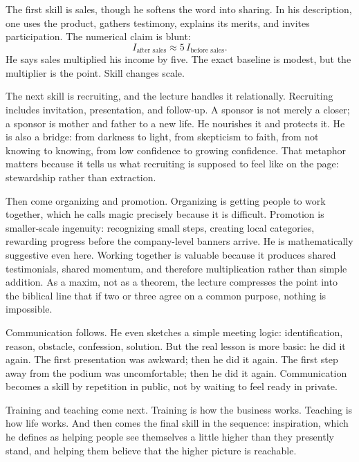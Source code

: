 The first skill is sales, though he softens the word into sharing. In his description, one uses the product, gathers testimony, explains its merits, and invites participation. The numerical claim is blunt:
\begin{equation}
I_{\text{after sales}} \approx 5\,I_{\text{before sales}}.
\end{equation}
He says sales multiplied his income by five. The exact baseline is modest, but the multiplier is the point. Skill changes scale.

The next skill is recruiting, and the lecture handles it relationally. Recruiting includes invitation, presentation, and follow-up. A sponsor is not merely a closer; a sponsor is mother and father to a new life. He nourishes it and protects it. He is also a bridge: from darkness to light, from skepticism to faith, from not knowing to knowing, from low confidence to growing confidence. That metaphor matters because it tells us what recruiting is supposed to feel like on the page: stewardship rather than extraction.

Then come organizing and promotion. Organizing is getting people to work together, which he calls magic precisely because it is difficult. Promotion is smaller-scale ingenuity: recognizing small steps, creating local categories, rewarding progress before the company-level banners arrive. He is mathematically suggestive even here. Working together is valuable because it produces shared testimonials, shared momentum, and therefore multiplication rather than simple addition. As a maxim, not as a theorem, the lecture compresses the point into the biblical line that if two or three agree on a common purpose, nothing is impossible.

Communication follows. He even sketches a simple meeting logic: identification, reason, obstacle, confession, solution. But the real lesson is more basic: he did it again. The first presentation was awkward; then he did it again. The first step away from the podium was uncomfortable; then he did it again. Communication becomes a skill by repetition in public, not by waiting to feel ready in private.

Training and teaching come next. Training is how the business works. Teaching is how life works. And then comes the final skill in the sequence: inspiration, which he defines as helping people see themselves a little higher than they presently stand, and helping them believe that the higher picture is reachable.

